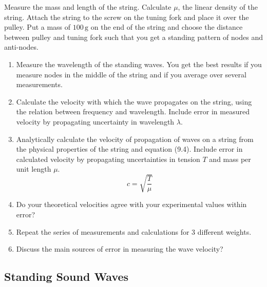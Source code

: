 Measure the mass and length of the string. Calculate $\mu$, the linear density of the string. Attach the string to the screw on the tuning fork and place it over the pulley. Put a mass of $100\, \textrm{g}$ on the end of the string and choose the distance between pulley and tuning fork such that you get a standing pattern of nodes and anti-nodes.
\begin{enumerate}
\item Measure the wavelength of the standing waves. You get the best results if you measure nodes in the middle of the string and if you average over several measurements.
\item Calculate the velocity with which the wave propagates on the string, using the relation between frequency and wavelength. Include error in measured velocity by propagating uncertainty in wavelength $\lambda$.
\item Analytically calculate the velocity of propagation of waves on a string from the physical properties of the string and equation (9.4). Include error in calculated velocity by propagating uncertainties in tension $T$ and mass per unit length $\mu$. 
  \begin{equation}
    c=\sqrt{\frac{T}{\mu}}
  \end{equation}

\item Do your theoretical velocities agree with your experimental values within error?
\item Repeat the series of measurements and calculations for 3 different weights.
\item Discuss the main sources of error in measuring the wave velocity?

\end{enumerate}

\subsection{Standing Sound Waves}

